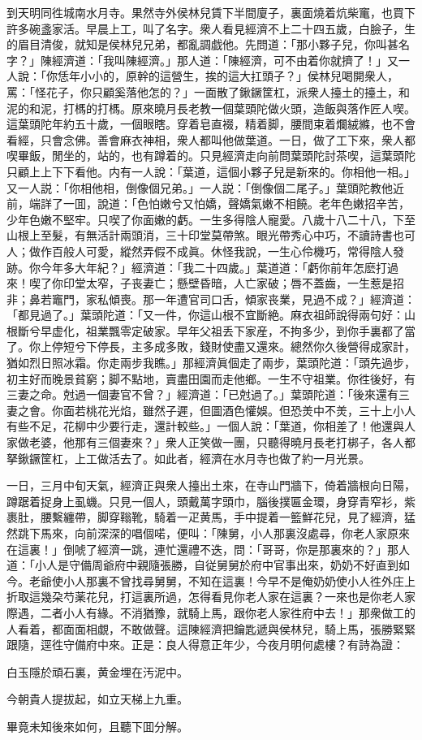 到天明同徃城南水月寺。果然寺外侯林兒賃下半間廈子，裏面燒着炕柴竃，也買下許多碗盞家活。早晨上工，叫了名字。衆人看見經濟不上二十四五歲，白臉子，生的眉目清俊，就知是侯林兒兄弟，都亂調戯他。先問道：「那小夥子兒，你叫甚名字？」陳經濟道：「我叫陳經濟。」那人道：「陳經濟，可不由着你就擠了！」又一人說：「你恁年小小的，原幹的這營生，挨的這大扛頭子？」侯林兒喝開衆人，罵：「怪花子，你只顧奚落他怎的？」一面散了鍬鐝筐杠，派衆人擡土的擡土，和泥的和泥，打榪的打榪。原來曉月長老教一個葉頭陀做火頭，造飯與落作匠人喫。這葉頭陀年約五十歲，一個眼瞎。穿着皂直裰，精着脚，腰間束着爛絨縧，也不會看經，只會念佛。善會麻衣神相，衆人都叫他做葉道。一日，做了工下來，衆人都喫畢飯，閒坐的，站的，也有蹲着的。只見經濟走向前問葉頭陀討茶喫，這葉頭陀只顧上上下下看他。内有一人說：「葉道，這個小夥子兒是新來的。你相他一相。」又一人説：「你相他相，倒像個兄弟。」一人説：「倒像個二尾子。」葉頭陀教他近前，端詳了一囬，說道：「色怕嫩兮又怕嬌，聲嬌氣嫩不相饒。老年色嫩招辛苦，少年色嫩不堅牢。只喫了你面嫩的虧。一生多得陰人寵愛。八歲十八二十八，下至山根上至髮，有無活計兩頭消，三十印堂莫帶煞。眼光帶秀心中巧，不讀詩書也可人；做作百般人可愛，縱然弄假不成眞。休怪我說，一生心伶機巧，常得陰人發跡。你今年多大年紀？」經濟道：「我二十四歲。」葉道道：「虧你前年怎麽打過來！喫了你印堂太窄，子丧妻亡；懸壁昏暗，人亡家破；唇不蓋齒，一生惹是招非；鼻若竈門，家私傾喪。那一年遭官司口舌，傾家丧業，見過不成？」經濟道：「都見過了。」葉頭陀道：「又一件，你這山根不宜斷絶。麻衣祖師說得兩句好：山根斷兮早虚化，祖業飄零定破家。早年父祖丢下家産，不拘多少，到你手裏都了當了。你上停短兮下停長，主多成多敗，錢財使盡又還來。總然你久後營得成家計，猶如烈日照冰霜。你走兩步我瞧。」那經濟眞個走了兩步，葉頭陀道：「頭先過步，初主好而晚景貧窮；脚不點地，賣盡田園而走他鄉。一生不守祖業。你徃後好，有三妻之命。尅過一個妻官不曾？」經濟道：「已尅過了。」葉頭陀道：「後來還有三妻之會。你面若桃花光焰，雖然子遲，但圖酒色懽娛。但恐羙中不羙，三十上小人有些不足，花柳中少要行走，還計較些。」一個人說：「葉道，你相差了！他還與人家做老婆，他那有三個妻來？」衆人正笑做一團，只聽得曉月長老打梆子，各人都拏鍬鐝筐杠，上工做活去了。如此者，經濟在水月寺也做了約一月光景。

一日，三月中旬天氣，經濟正與衆人擡出土來，在寺山門牆下，倚着牆根向日陽，蹲踞着捉身上虱蟣。只見一個人，頭戴萬字頭巾，腦後撲匾金環，身穿青窄衫，紫裹肚，腰繫纏帶，脚穿䩺靴，騎着一疋黄馬，手中提着一籃鮮花兒，見了經濟，猛然跳下馬來，向前深深的唱個喏，便叫：「陳舅，小人那裏沒處尋，你老人家原來在這裏！」倒唬了經濟一跳，連忙還禮不迭，問：「哥哥，你是那裏來的？」那人道：「小人是守備周爺府中親隨張勝，自従舅舅於府中官事出來，奶奶不好直到如今。老爺使小人那裏不曾找尋舅舅，不知在這裏！今早不是俺奶奶使小人徃外庄上折取這幾朶芍薬花兒，打這裏所過，怎得看見你老人家在這裏？一來也是你老人家際遇，二者小人有緣。不消猶豫，就騎上馬，跟你老人家徃府中去！」那衆做工的人看着，都面面相覷，不敢做聲。這陳經濟把鑰匙遞與侯林兒，騎上馬，張勝緊緊跟隨，逕徃守備府中來。正是：良人得意正年少，今夜月明何處樓？有詩為證：

\begin{myquote}
白玉隱於頑石裏，黄金埋在汚泥中。

今朝貴人提拔起，如立天梯上九重。
\end{myquote}

畢竟未知後來如何，且聽下囬分解。

